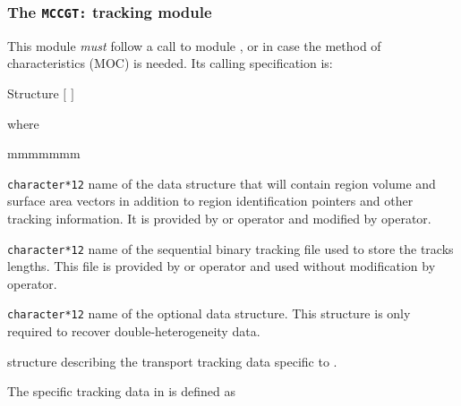 \subsubsection{The {\tt MCCGT:} tracking module}\label{sect:MCCGData}

This module {\sl must} follow a call to module ,  or  in case the method of characteristics (MOC) is needed. Its calling
specification is:

\begin{DataStructure}{Structure }
 \moc{:=}    
$[$  $]$ \moc{::} 
\end{DataStructure}

\noindent  where
\begin{ListeDeDescription}{mmmmmmm}

\item[\dusa{TRKNAM}] {\tt character*12} name of the  data
structure that will contain region volume and surface area vectors in
addition to region identification pointers and other tracking information. It is provided by  or  operator and modified by  operator.

\item[\dusa{TRKFIL}] {\tt character*12} name of the sequential binary tracking file used to store the tracks lengths. This file is provided by  or  operator and used without modification by  operator.

\item[\dusa{GEONAM}] {\tt character*12} name of the optional  data
structure. This structure is only required to recover double-heterogeneity data.

\item[\dstr{descmccg}] structure describing the transport tracking data
specific to .

\end{ListeDeDescription}

\vskip 0.15cm

The  specific tracking data in  is defined as

